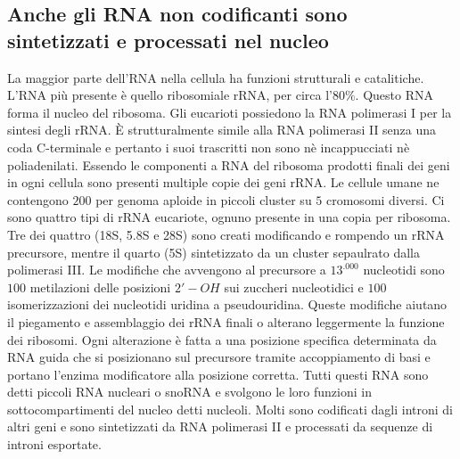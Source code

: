 \subsection{Anche gli RNA non codificanti sono sintetizzati e processati nel nucleo}
La maggior parte dell'RNA nella cellula ha funzioni strutturali e catalitiche. L'RNA pi\`u presente \`e quello ribosomiale rRNA, per circa l'$80\%$. Questo RNA forma il nucleo del
ribosoma. Gli eucarioti possiedono la RNA polimerasi I per la sintesi degli rRNA. \`E strutturalmente simile alla RNA polimerasi II senza una coda C-terminale e pertanto i suoi 
trascritti non sono n\`e incappucciati n\`e poliadenilati. Essendo le componenti a RNA del ribosoma prodotti finali dei geni in ogni cellula sono presenti multiple copie dei geni rRNA. Le
cellule umane ne contengono $200$ per genoma aploide in piccoli cluster su $5$ cromosomi diversi. Ci sono quattro tipi di rRNA eucariote, ognuno presente in una copia per ribosoma. Tre
dei quattro (18S, 5.8S e 28S) sono creati modificando e rompendo un rRNA precursore, mentre il quarto (5S) sintetizzato da un cluster sepaulrato dalla polimerasi III. Le modifiche
che avvengono al precursore a $13^.000$ nucleotidi sono $100$ metilazioni delle posizioni $2'-OH$ sui zuccheri nucleotidici e $100$ isomerizzazioni dei nucleotidi uridina a 
pseudouridina. Queste modifiche aiutano il piegamento e assemblaggio dei rRNA finali o alterano leggermente la funzione dei ribosomi. Ogni alterazione \`e fatta a una posizione specifica
determinata da RNA guida che si posizionano sul precursore tramite accoppiamento di basi e portano l'enzima modificatore alla posizione corretta. Tutti questi RNA sono detti piccoli RNA 
nucleari o snoRNA e svolgono le loro funzioni in sottocompartimenti del nucleo detti nucleoli. Molti sono codificati dagli introni di altri geni e sono sintetizzati da RNA polimerasi II
e processati da sequenze di introni esportate.

